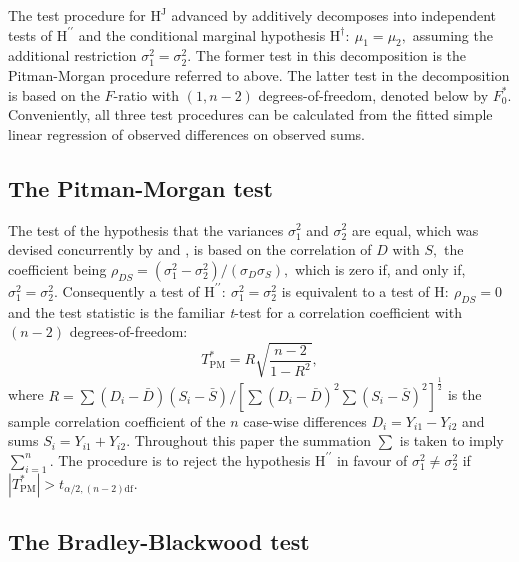 \documentclass[12pt, a4paper]{report}
\theoremstyle{plain}
\theoremstyle{definition}
\theoremstyle{remark}
\begin{document}
The test procedure for $\textrm{H}^\mathrm{J}$ advanced by \citet{BB89} additively decomposes into independent tests of $\textrm{H}^{\prime\prime}$ and the conditional marginal hypothesis $\textrm{H}^\dag\colon~\mu_1 = \mu_2,$ assuming the additional restriction $\sigma^2_1 = \sigma^2_2.$  The former test in this decomposition is the Pitman-Morgan procedure referred to above. The latter test in the decomposition is based on the $F$-ratio with $(1,n-2)$ degrees-of-freedom, denoted below by $F_0^\ast.$ Conveniently, all three test procedures can be calculated from the fitted simple linear regression of observed differences on observed sums. 



\subsection{The Pitman-Morgan test}

The test of the hypothesis that the variances $\sigma^2_1$ and $\sigma^2_2$ are equal, which was devised concurrently by \cite{pitman} and \cite{morgan}, is based on the correlation of $D$ with $S,$ the coefficient being $\rho_{DS} = (\sigma^2_1 - \sigma^2_2) / (\sigma_D \sigma_S ),$ which is zero if, and only if, $\sigma^2_1 = \sigma^2_2.$ Consequently a test of $\textrm{H}^{\prime\prime}\colon\ \sigma^2_1 = \sigma^2_2$ is equivalent to a test of $\textrm{H}\colon\ \rho_{DS}=0$ and the test statistic is the familiar {\it t}-test for a correlation coefficient with $(n-2)$ degrees-of-freedom:  
\[
T^*_\mathrm{PM} = R \sqrt{ \frac{n-2}{1-R^2} },
\]
where $R =  \sum (D_i-\bar{D})(S_i-\bar{S}) / [ \sum(D_i-\bar{D})^2 \sum (S_i-\bar{S})^2 ]^{\frac{1}{2}} $ 
is the sample correlation coefficient of the $n$ case-wise differences $D_i = Y_{i1} - Y_{i2}$ and sums $S_i = Y_{i1} + Y_{i2}.$ Throughout this paper the summation $\sum$ is taken to imply $\sum_{i=1}^n.$  The procedure is to reject the hypothesis $\textrm{H}^{\prime\prime}$ in favour of $\sigma^2_1\neq\sigma^2_2$ if $|T^*_\mathrm{PM}| >  t_{\alpha/2,(n-2)\textrm{df}}.$ 

\subsection{The Bradley-Blackwood test}
\end{document}
